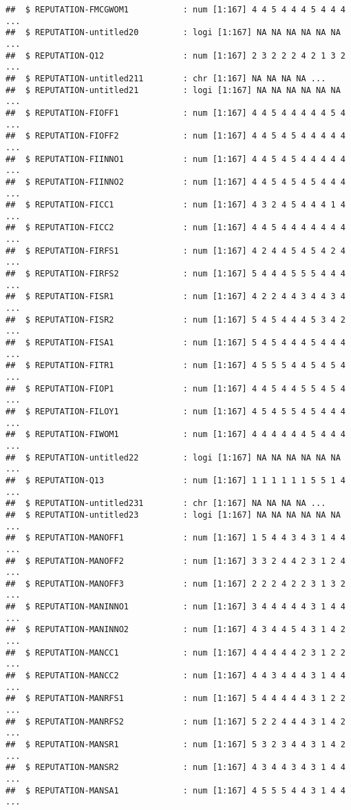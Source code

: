 \documentclass[
]{article}
\begin{document}
\begin{verbatim}
##  $ REPUTATION-FMCGWOM1           : num [1:167] 4 4 5 4 4 4 5 4 4 4 ...
##  $ REPUTATION-untitled20         : logi [1:167] NA NA NA NA NA NA ...
##  $ REPUTATION-Q12                : num [1:167] 2 3 2 2 2 4 2 1 3 2 ...
##  $ REPUTATION-untitled211        : chr [1:167] NA NA NA NA ...
##  $ REPUTATION-untitled21         : logi [1:167] NA NA NA NA NA NA ...
##  $ REPUTATION-FIOFF1             : num [1:167] 4 4 5 4 4 4 4 4 5 4 ...
##  $ REPUTATION-FIOFF2             : num [1:167] 4 4 5 4 5 4 4 4 4 4 ...
##  $ REPUTATION-FIINNO1            : num [1:167] 4 4 5 4 5 4 4 4 4 4 ...
##  $ REPUTATION-FIINNO2            : num [1:167] 4 4 5 4 5 4 5 4 4 4 ...
##  $ REPUTATION-FICC1              : num [1:167] 4 3 2 4 5 4 4 4 1 4 ...
##  $ REPUTATION-FICC2              : num [1:167] 4 4 5 4 4 4 4 4 4 4 ...
##  $ REPUTATION-FIRFS1             : num [1:167] 4 2 4 4 5 4 5 4 2 4 ...
##  $ REPUTATION-FIRFS2             : num [1:167] 5 4 4 4 5 5 5 4 4 4 ...
##  $ REPUTATION-FISR1              : num [1:167] 4 2 2 4 4 3 4 4 3 4 ...
##  $ REPUTATION-FISR2              : num [1:167] 5 4 5 4 4 4 5 3 4 2 ...
##  $ REPUTATION-FISA1              : num [1:167] 5 4 5 4 4 4 5 4 4 4 ...
##  $ REPUTATION-FITR1              : num [1:167] 4 5 5 5 4 4 5 4 5 4 ...
##  $ REPUTATION-FIOP1              : num [1:167] 4 4 5 4 4 5 5 4 5 4 ...
##  $ REPUTATION-FILOY1             : num [1:167] 4 5 4 5 5 4 5 4 4 4 ...
##  $ REPUTATION-FIWOM1             : num [1:167] 4 4 4 4 4 4 5 4 4 4 ...
##  $ REPUTATION-untitled22         : logi [1:167] NA NA NA NA NA NA ...
##  $ REPUTATION-Q13                : num [1:167] 1 1 1 1 1 1 5 5 1 4 ...
##  $ REPUTATION-untitled231        : chr [1:167] NA NA NA NA ...
##  $ REPUTATION-untitled23         : logi [1:167] NA NA NA NA NA NA ...
##  $ REPUTATION-MANOFF1            : num [1:167] 1 5 4 4 3 4 3 1 4 4 ...
##  $ REPUTATION-MANOFF2            : num [1:167] 3 3 2 4 4 2 3 1 2 4 ...
##  $ REPUTATION-MANOFF3            : num [1:167] 2 2 2 4 2 2 3 1 3 2 ...
##  $ REPUTATION-MANINNO1           : num [1:167] 3 4 4 4 4 4 3 1 4 4 ...
##  $ REPUTATION-MANINNO2           : num [1:167] 4 3 4 4 5 4 3 1 4 2 ...
##  $ REPUTATION-MANCC1             : num [1:167] 4 4 4 4 4 2 3 1 2 2 ...
##  $ REPUTATION-MANCC2             : num [1:167] 4 4 3 4 4 4 3 1 4 4 ...
##  $ REPUTATION-MANRFS1            : num [1:167] 5 4 4 4 4 4 3 1 2 2 ...
##  $ REPUTATION-MANRFS2            : num [1:167] 5 2 2 4 4 4 3 1 4 2 ...
##  $ REPUTATION-MANSR1             : num [1:167] 5 3 2 3 4 4 3 1 4 2 ...
##  $ REPUTATION-MANSR2             : num [1:167] 4 3 4 4 3 4 3 1 4 4 ...
##  $ REPUTATION-MANSA1             : num [1:167] 4 5 5 5 4 4 3 1 4 4 ...

\end{verbatim}
\end{document}
